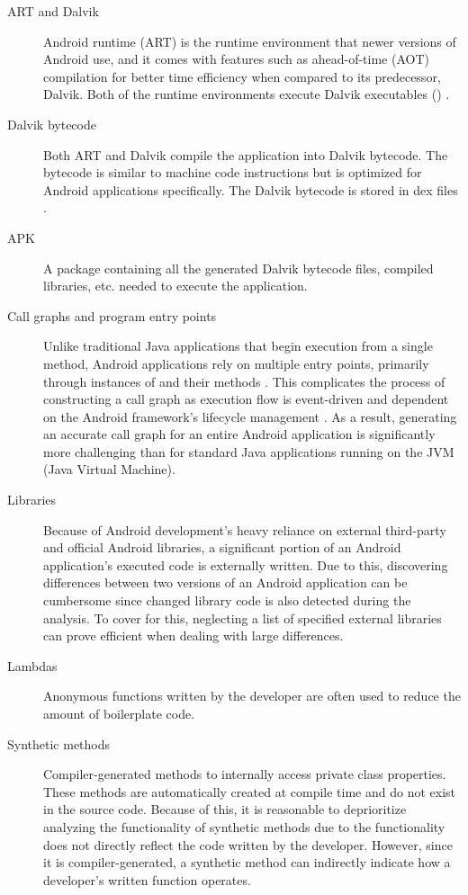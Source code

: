 \begin{description}
    \item[ART and Dalvik] Android runtime (ART) is the runtime environment that newer versions of Android use, and it comes with features such as ahead-of-time (AOT) compilation for better time efficiency when compared to its predecessor, Dalvik. Both of the runtime environments execute Dalvik executables () \cite{AndroidRuntime_official}.
    
    \item[Dalvik bytecode] Both ART and Dalvik compile the application into Dalvik bytecode. The bytecode is similar to machine code instructions but is optimized for Android applications specifically. The Dalvik bytecode is stored in dex files \cite{DalvikBytecode_official}.

    \item[APK] A package containing all the generated Dalvik bytecode files, compiled libraries, etc. needed to execute the application.

    \item[Call graphs and program entry points] Unlike traditional Java applications that begin execution from a single  method, Android applications rely on multiple entry points, primarily through instances of  and their  methods \cite{android_official-ActivitiesGuide}. This complicates the process of constructing a call graph as execution flow is event-driven and dependent on the Android framework’s lifecycle management \cite{android_official-ActivitiesGuide}. As a result, generating an accurate call graph for an entire Android application is significantly more challenging than for standard Java applications running on the JVM (Java Virtual Machine).

    \item[Libraries] Because of Android development’s heavy reliance on external third-party and official Android libraries, a significant portion of an Android application’s executed code is externally written. Due to this, discovering differences between two versions of an Android application can be cumbersome since changed library code is also detected during the analysis. To cover for this, neglecting a list of specified external libraries can prove efficient when dealing with large differences.
    
    \item[Lambdas] Anonymous functions written by the developer are often used to reduce the amount of boilerplate code.
    
    \item[Synthetic methods] Compiler-generated methods to internally access private class properties. These methods are automatically created at compile time and do not exist in the source code. Because of this, it is reasonable to deprioritize analyzing the functionality of synthetic methods due to the functionality does not directly reflect the code written by the developer. However, since it is compiler-generated, a synthetic method can indirectly indicate how a developer's written function operates.
\end{description}



